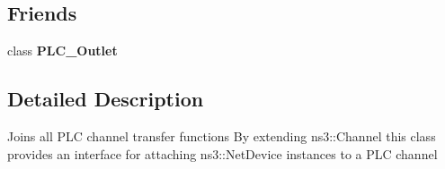 \subsection*{\-Friends}
\begin{DoxyCompactItemize}
\item 
\hypertarget{classns3_1_1PLC__Channel_ae6906119e2bc3e6a134b7087a1ad1afe}{class {\bfseries \-P\-L\-C\-\_\-\-Outlet}}\label{classns3_1_1PLC__Channel_ae6906119e2bc3e6a134b7087a1ad1afe}

\end{DoxyCompactItemize}


\subsection{\-Detailed \-Description}
\-Joins all \-P\-L\-C channel transfer functions \-By extending ns3\-::\-Channel this class provides an interface for attaching ns3\-::\-Net\-Device instances to a \-P\-L\-C channel 

